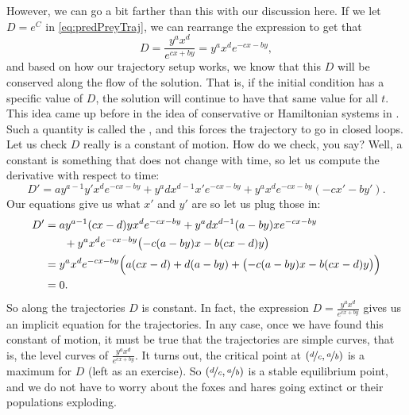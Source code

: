 \documentclass{ximera}
\begin{document}
However, we can go a bit farther than this with our discussion here. If we let $D = e^C$ in \eqref{eq:predPreyTraj}, we can rearrange the expression to get that 
\begin{equation*}
    D = \frac{y^a x^d}{e^{cx+by}} = y^a x^d e^{-cx-by},
\end{equation*}
and based on how our trajectory setup works, we know that this $D$ will be conserved along the flow of the solution. That is, if the initial condition has a specific value of $D$, the solution will continue to have that same value for all $t$. This idea came up before in the idea of conservative or Hamiltonian systems in . Such a quantity is called the \emph{}, and this forces the trajectory to go in closed loops.  Let us check $D$ really is a constant of motion.  How do we check, you say?  Well, a constant is something that does not change with time, so let us compute the derivative with respect to time:
\begin{equation*}
    D' =  a y^{a-1}y' x^d e^{-cx-by} + y^a d x^{d-1} x' e^{-cx-by} + y^a x^d e^{-cx-by} (-cx'-by') .
\end{equation*}
Our equations give us what $x'$ and $y'$ are so let us plug those in:
\begin{equation*}
    \begin{split}
        D' & = a y^{a-1} (cx-d)y x^d e^{-cx-by} + y^a d x^{d-1} (a-by)x e^{-cx-by} \\
        & \phantom{mm} + y^a x^d e^{-cx-by} \bigl(-c(a-by)x-b(cx-d)y\bigr) \\
        & = y^a x^d e^{-cx-by}
        \Bigl(
            a (cx-d) + d (a-by) + \bigl(-c(a-by)x-b(cx-d)y\bigr) 
        \Bigr) \\
        & = 0 .
    \end{split}
\end{equation*}
So along the trajectories $D$ is constant.  In fact, the expression $D = \frac{y^a x^d}{e^{cx+by}}$ gives us an implicit equation for the trajectories.  In any case, once we have found this constant of motion, it must be true that the trajectories are simple curves, that is, the level curves of $\frac{y^a x^d}{e^{cx+by}}$.  It turns out, the critical point at $(\nicefrac{d}{c},\nicefrac{a}{b})$ is a maximum for $D$ (left as an exercise). So $(\nicefrac{d}{c},\nicefrac{a}{b})$ is a stable equilibrium point, and we do not have to worry about the foxes and hares going extinct or their populations exploding.
\end{document}

